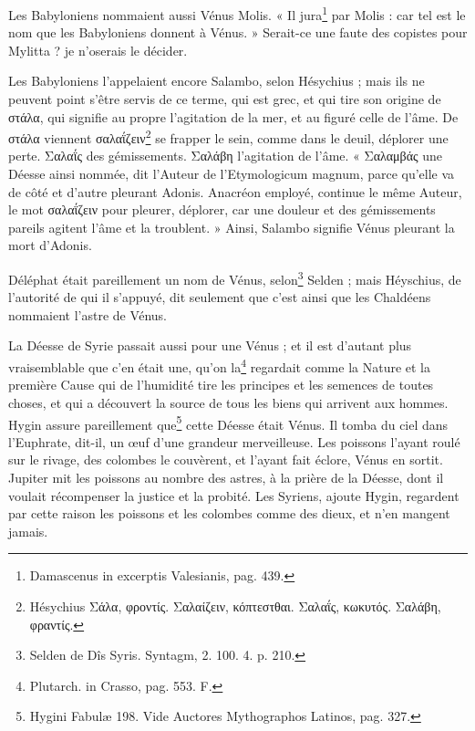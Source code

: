 \documentclass[a4paper, 11pt, oneside, polutonikogreek, french]{article}
\begin{document}
Les Babyloniens nommaient aussi Vénus Molis. « Il jura\footnote{Damascenus in excerptis Valesianis, pag. 439.} par Molis : car tel est le nom que les Babyloniens donnent à Vénus. » Serait-ce une faute des copistes pour Mylitta ? je n'oserais le décider.

Les Babyloniens l'appelaient encore Salambo, selon Hésychius ; mais ils ne peuvent point s'être servis de ce terme, qui est grec, et qui tire son origine de στάλα, qui signifie au propre l'agitation de la mer, et au figuré celle de l'âme. De στάλα viennent σαλαΐζειν\footnote{Hésychius Σάλα, φροντίς. Σαλαίζειν, κόπτεστθαι. Σαλαΐς, κωκυτός. Σαλάβη, φραντίς.} se frapper le sein, comme dans le deuil, déplorer une perte. Σαλαΐς des gémissements. Σαλάβη l'agitation de l'âme. « Σαλαμβάς une Déesse ainsi nommée, dit l'Auteur de l'Etymologicum magnum, parce qu'elle va de côté et d'autre pleurant Adonis. Anacréon employé, continue le même Auteur, le mot σαλαΐζειν pour pleurer, déplorer, car une douleur et des gémissements pareils agitent l'âme et la troublent. » Ainsi, Salambo signifie Vénus pleurant la mort d'Adonis.

Déléphat était pareillement un nom de Vénus, selon\footnote{Selden de Dîs Syris. Syntagm, 2. 100. 4. p. 210.} Selden ; mais Héyschius, de l'autorité de qui il s'appuyé, dit seulement que c'est ainsi que les Chaldéens nommaient l'astre de Vénus.

La Déesse de Syrie passait aussi pour une Vénus ; et il est d'autant plus vraisemblable que c'en était une, qu'on la\footnote{Plutarch. in Crasso, pag. 553. F.} regardait comme la Nature et la première Cause qui de l'humidité tire les principes et les semences de toutes choses, et qui a découvert la source de tous les biens qui arrivent aux hommes. Hygin assure pareillement que\footnote{Hygini Fabulæ 198. Vide Auctores Mythographos Latinos, pag. 327.} cette Déesse était Vénus. Il tomba du ciel dans l'Euphrate, dit-il, un œuf d'une grandeur merveilleuse. Les poissons l'ayant roulé sur le rivage, des colombes le couvèrent, et l'ayant fait éclore, Vénus en sortit. Jupiter mit les poissons au nombre des astres, à la prière de la Déesse, dont il voulait récompenser la justice et la probité. Les Syriens, ajoute Hygin, regardent par cette raison les poissons et les colombes comme des dieux, et n'en mangent jamais.
\end{document}
